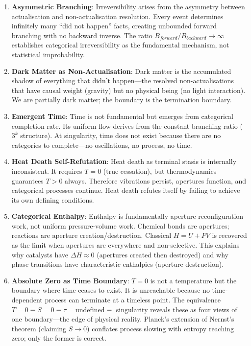 \begin{enumerate}
    \item \textbf{Asymmetric Branching}: Irreversibility arises from the asymmetry between actualisation and non-actualisation resolution. Every event determines infinitely many ``did not happen'' facts, creating unbounded forward branching with no backward inverse. The ratio $B_{forward}/B_{backward} \to \infty$ establishes categorical irreversibility as the fundamental mechanism, not statistical improbability.

    \item \textbf{Dark Matter as Non-Actualisation}: Dark matter is the accumulated shadow of everything that didn't happen---the resolved non-actualisations that have causal weight (gravity) but no physical being (no light interaction). We are partially dark matter; the boundary is the termination boundary.

    \item \textbf{Emergent Time}: Time is not fundamental but emerges from categorical completion rate. Its uniform flow derives from the constant branching ratio ($3^k$ structure). At singularity, time does not exist because there are no categories to complete---no oscillations, no process, no time.

    \item \textbf{Heat Death Self-Refutation}: Heat death as terminal stasis is internally inconsistent. It requires $T = 0$ (true cessation), but thermodynamics guarantees $T > 0$ always. Therefore vibrations persist, apertures function, and categorical processes continue. Heat death refutes itself by failing to achieve its own defining conditions.

    \item \textbf{Categorical Enthalpy}: Enthalpy is fundamentally aperture reconfiguration work, not uniform pressure-volume work. Chemical bonds are apertures; reactions are aperture creation/destruction. Classical $H = U + PV$ is recovered as the limit when apertures are everywhere and non-selective. This explains why catalysts have $\Delta H \approx 0$ (apertures created then destroyed) and why phase transitions have characteristic enthalpies (aperture destruction).

    \item \textbf{Absolute Zero as Time Boundary}: $T = 0$ is not a temperature but the boundary where time ceases to exist. It is unreachable because no time-dependent process can terminate at a timeless point. The equivalence $T = 0 \equiv S = 0 \equiv \tau = \text{undefined} \equiv$ singularity reveals these as four views of one boundary---the edge of physical reality. Planck's extension of Nernst's theorem (claiming $S \to 0$) conflates process slowing with entropy reaching zero; only the former is correct.


\end{enumerate}
